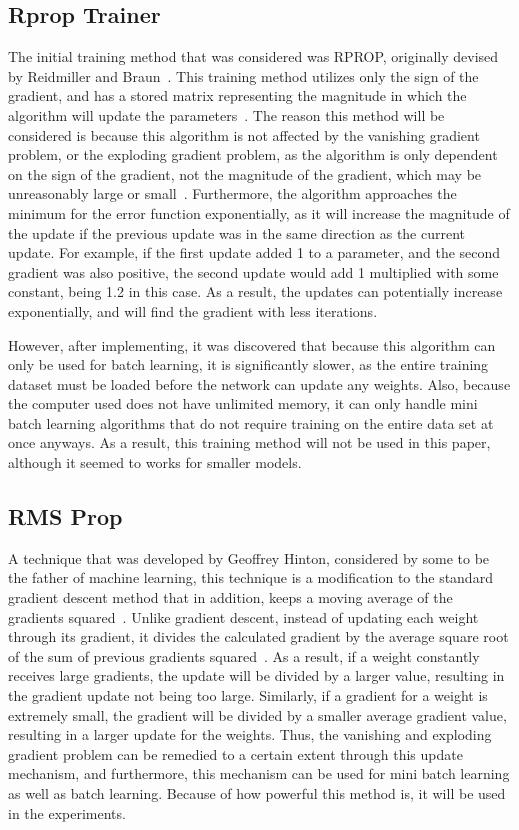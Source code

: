 \documentclass[12pt]{article}
\begin{document}
\subsection{Rprop Trainer}
The initial training method that was considered was RPROP, originally devised by
Reidmiller and Braun~\cite{rprop}. This training method utilizes only the sign
of the gradient, and has a stored matrix representing the magnitude in which the
algorithm will update the parameters~\cite{rprop}. The reason this method will
be considered is because this algorithm is not affected by the vanishing
gradient problem, or the exploding gradient problem, as the algorithm is only
dependent on the sign of the gradient, not the magnitude of the gradient, which
may be unreasonably large or small~\cite{rprop}.
Furthermore, the algorithm approaches the minimum for the error function
exponentially, as it will increase the magnitude of the update if the previous
update was in the same direction as the current update. For example, if the
first update added 1 to a parameter, and the second gradient was also positive,
the second update would add 1 multiplied with some constant, being 1.2 in this
case. As a result, the updates can potentially increase exponentially, and will
find the gradient with less iterations.

However, after implementing, it was discovered that because this algorithm can
only be used for batch learning, it is significantly slower, as the entire
training dataset must be loaded before the network can update any weights. Also,
because the computer used does not have unlimited memory, it can only handle
mini batch learning algorithms that do not require training on the entire data
set at once anyways.  As a result, this training method will not be used in this
paper, although it seemed to works for smaller models.

\subsection{RMS Prop}
A technique that was developed by Geoffrey Hinton, considered by some to be the
father of machine learning, this technique is a modification to the standard
gradient descent method that in addition, keeps a moving average of the
gradients squared~\cite{rmsprop}. Unlike gradient descent, instead of updating
each weight through its gradient, it divides the calculated gradient by the
average square root of the sum of previous gradients squared~\cite{rmsprop}. As
a result, if a weight constantly receives large gradients, the update will be
divided by a larger value, resulting in the gradient update not being too large.
Similarly, if a gradient for a weight is extremely small, the gradient will be
divided by a smaller average gradient value, resulting in a larger update for
the weights. Thus, the vanishing and exploding gradient problem can be remedied
to a certain extent through this update mechanism, and furthermore, this
mechanism can be used for mini batch learning as well as batch learning. Because
of how powerful this method is, it will be used in the experiments.
\end{document}
